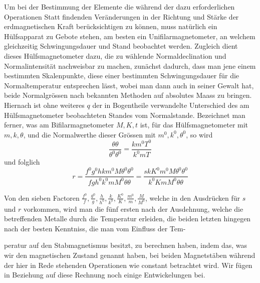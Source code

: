 Um bei der Bestimmung der Elemente die während der dazu erforderlichen Operationen Statt findenden Veränderungen in der Richtung und Stärke der erdmagnetischen Kraft berücksichtigen zu können, muss natürlich ein Hülfsapparat zu Gebote stehen, am besten ein Unifilarmagnetometer, an welchem gleichzeitig Schwingungsdauer und Stand beobachtet werden. Zugleich dient dieses Hülfsmagnetometer dazu, die zu wählende Normaldeclination und Normalintensität nachweisbar zu machen, zunächst dadurch, dass man jene einem bestimmten Skalenpunkte, diese einer bestimmten Schwingungsdauer für die Normaltemperatur entsprechen lässt, wobei man dann auch in seiner Gewalt hat, beide Normalgrössen nach bekannten Methoden auf absolutes Maass zu bringen. Hiernach ist ohne weiteres $q$ der in Bogentheile verwandelte Unterschied des am Hülfsmagnetometer beobachteten Standes vom Normalstande. Bezeichnet man ferner, was am Bifilarmagnetometer $M,K,t$ ist, für das Hülfsmagnetometer mit $m,k,\theta$, und die Normalwerthe dieser Grössen mit $m^0,k^0,\theta^0$, so wird
\[
\frac{\theta\theta}{\theta^0\theta^0}=\frac{km^0T^0}{k^0mT}
\]
und folglich
\[
r=\frac{f^0g^0hkm^0M\theta^0\theta^0}{fgh^0k^0mM^0\theta\theta}=\frac{skK^0m^0M\theta^0\theta^0}{k^0KmM^0\theta\theta}
\]

Von den sieben Factoren $\frac{f^0}{f},\frac{g^0}{g},\frac{h}{h^0},\frac{k}{k^0},\frac{K^0}{K},\frac{m^0}{m},\frac{M}{M^0}$, welche in den Ausdrücken für $s$ und $r$ vorkommen, wird man die fünf ersten nach der Ausdehnung, welche die betreffenden Metalle durch die Temperatur erleiden, die beiden letzten hingegen nach der besten Kenntniss, die man vom Einfluss der Tem-
\par\GaussVSourceGathering{52\textsuperscript{*}}
\par\clearpage
{}
\noindent peratur auf den Stabmagnetismus besitzt, zu berechnen haben, indem das, was wir den magnetischen Zustand genannt haben, bei beiden Magnetstäben während der hier in Rede stehenden Operationen wie constant betrachtet wird. Wir fügen in Beziehung auf diese Rechnung noch einige Entwickelungen bei.

